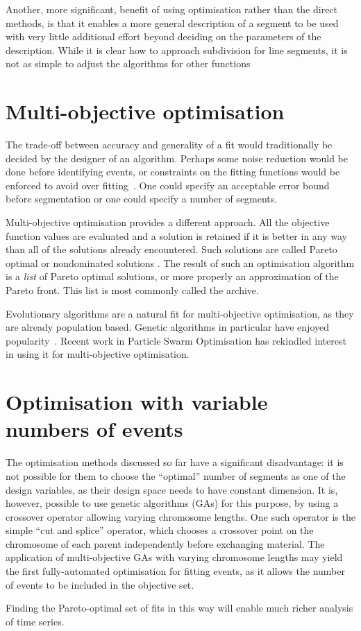 Another, more significant, benefit of using optimisation rather than
the direct methods, is that it enables a more general description of a
segment to be used with very little additional effort beyond deciding
on the parameters of the description.  While it is clear how to
approach subdivision for line segments, it is not as simple to adjust
the algorithms for other functions~\citep{waibel.lee1990readings}

\section{Multi-objective optimisation}
\label{sec:multi-object-optim}
The trade-off between accuracy and generality of a fit would
traditionally be decided by the designer of an algorithm.  Perhaps
some noise reduction would be done before identifying events, or
constraints on the fitting functions would be enforced to avoid over
fitting~\citep{arora.khot2003fitting,punskaya.andrieu.ea2002bayesian}.  One could
specify an acceptable error bound before segmentation or one could
specify a number of segments.

Multi-objective optimisation provides a different approach.  All the
objective function values are evaluated and a solution is retained if
it is better in any way than all of the solutions already encountered.
Such solutions are called Pareto optimal or nondominated
solutions \citep{steuer1986multiple}. The result of such an optimisation
algorithm is a \emph{list} of Pareto optimal solutions, or more
properly an approximation of the Pareto front.  This list is most
commonly called the archive.

Evolutionary algorithms are a natural fit for multi-objective
optimisation, as they are already population based.  Genetic
algorithms in particular have enjoyed
popularity~\citep{deb.kalyanmoy2001multi-objective}.  Recent work in Particle
Swarm Optimisation has rekindled interest in using it for
multi-objective optimisation.

\section{Optimisation with variable numbers of events}
The optimisation methods discussed so far have a significant disadvantage: it is not possible for them to choose the ``optimal''
number of segments as one of the design variables, as their design space
needs to have constant dimension. 
It is, however, possible to use genetic algorithms (GAs) for this purpose, by using a crossover operator allowing varying chromosome lengths. 
One such operator is the simple ``cut and splice'' operator, which chooses a crossover point on the chromosome of each parent independently before exchanging material.
The application of multi-objective GAs with varying chromosome lengths may yield the first fully-automated optimisation for fitting events, as it allows the number of events to be included in the objective set.

Finding the Pareto-optimal set of fits in this way will enable much richer analysis of time series.


